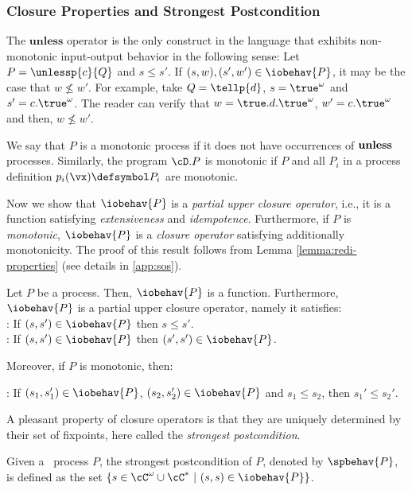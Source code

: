 \documentclass{tlp}
\begin{document}
\subsubsection{Closure Properties and Strongest Postcondition}
The $\mathbf{unless}$ operator is the only construct in the language that exhibits 
non-monotonic input-output behavior in the following sense: Let $P=\unlessp{c}{Q}$ and  $s \leq s'$.  If $(s,w), (s',w')\in \iobehav{P}$, it may be the case that $w \not\leq w'$. For example, take $Q=\tellp{d}$, $s=\true^\omega$ and  $s'=c.\true^\omega$.
The reader can verify that  $w=\true.d.\true^\omega$, $w'=c.\true^\omega$ and then,  $w \not\leq w'$. 

\begin{definition}\label{def:monotonic}
We say that $P$ is a monotonic process if it does not have occurrences of ${\bf unless}$ processes. Similarly, the program $\cD.P$ is monotonic if $P$ and all $P_i$ in a process definition $p_i(\vx)\defsymbol P_i$ are monotonic. 
\end{definition}

Now we  show that $\iobehav{P}$  is a \emph{partial upper closure operator}, i.e., it is a function satisfying  \emph{extensiveness} and  \emph{idempotence}. Furthermore, if $P$ is \emph{monotonic},  $\iobehav{P}$ is a \emph{closure operator} satisfying additionally monotonicity. The proof of this result follows from   Lemma \ref{lemma:redi-properties} (see details in \ref{app:sos}). 


\begin{lemma}\label{lem:COP}
Let $P$ be a process. Then, $\iobehav{P}$ is a function. Furthermore, $\iobehav{P}$  is a  partial  upper  closure operator,  namely it satisfies:
\\ : If $(s,s') \in  \iobehav{P}$  then $s \leq s'$.\\
: If $(s,s') \in  \iobehav{P}$  then $(s',s') \in  \iobehav{P}$.

Moreover, if $P$ is monotonic, then:

: If  $(s_1,s_1') \in  \iobehav{P}$,   $(s_2 ,s_2' ) \in  \iobehav{P}$ and  $s_1 \leq s_2$, then  $s_1' \leq s_2'$.

\end{lemma}

A pleasant property of closure operators is that they are uniquely determined by their set of fixpoints, here called the \emph{strongest postcondition}.
\begin{definition}\label{def:sp}
Given a \utcc\ process $P$, the strongest postcondition of $P$,
denoted by $\spbehav{P}$, is defined as the set $\{s\in \cC^\omega \cup \cC^* \ | \ (s,s) \in \iobehav{P}\}$.
\end{definition}
\end{document}
